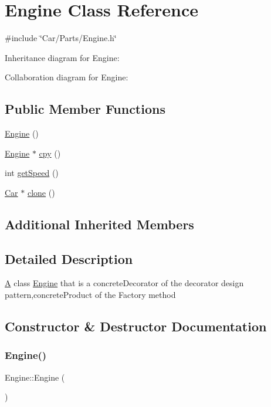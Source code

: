 \hypertarget{classEngine}{}\section{Engine Class Reference}
\label{classEngine}


{\ttfamily \#include \char`\"{}Car/\+Parts/\+Engine.\+h\char`\"{}}



Inheritance diagram for Engine\+:


Collaboration diagram for Engine\+:
\subsection*{Public Member Functions}
\begin{DoxyCompactItemize}
\item 
\hyperlink{classEngine_a8c98683b0a3aa28d8ab72a8bcd0d52f2}{Engine} ()
\item 
\hyperlink{classEngine}{Engine} $\ast$ \hyperlink{classEngine_a9cf97e7e9b82db13748a00256c1e4509}{cpy} ()
\item 
int \hyperlink{classEngine_a5f828ac1355f02d43f8bae90fbddb131}{get\+Speed} ()
\item 
\hyperlink{classCar}{Car} $\ast$ \hyperlink{classEngine_a18a3b9d950e67a868420b79890ba1428}{clone} ()
\end{DoxyCompactItemize}
\subsection*{Additional Inherited Members}


\subsection{Detailed Description}
\hyperlink{classA}{A} class \hyperlink{classEngine}{Engine} that is a concrete\+Decorator of the decorator design pattern,concrete\+Product of the Factory method 

\subsection{Constructor \& Destructor Documentation}
\mbox{\label{classEngine_a8c98683b0a3aa28d8ab72a8bcd0d52f2}} 
\subsubsection{\texorpdfstring{Engine()}{Engine()}}
{\footnotesize\ttfamily Engine\+::\+Engine (\begin{DoxyParamCaption}{ }\end{DoxyParamCaption})}


